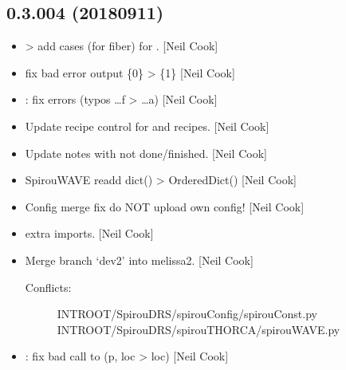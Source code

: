 \documentclass[a4paper,10pt,english]{report}
\begin{document}
\subsection{0.3.004 (2018\sphinxhyphen{}09\sphinxhyphen{}11)}
\label{\detokenize{misc/changelog:id350}}\begin{itemize}
\item {} 
 \textendash{}\textgreater{} add cases (for fiber) for .
{[}Neil Cook{]}

\item {} 
 \sphinxhyphen{} fix bad error output \{0\} \textendash{}\textgreater{} \{1\} {[}Neil Cook{]}

\item {} 
: fix errors (typos …f \textendash{}\textgreater{} …a) {[}Neil Cook{]}

\item {} 
Update recipe control for  and  recipes. {[}Neil Cook{]}

\item {} 
Update notes with not done/finished. {[}Neil Cook{]}

\item {} 
SpirouWAVE \sphinxhyphen{} re\sphinxhyphen{}add dict() \textendash{}\textgreater{} OrderedDict() {[}Neil Cook{]}

\item {} 
Config \sphinxhyphen{} merge fix \sphinxhyphen{} do NOT upload own config! {[}Neil Cook{]}

\item {} 
 \sphinxhyphen{} extra imports. {[}Neil Cook{]}

\item {} 
Merge branch ‘dev2’ into melissa2. {[}Neil Cook{]}
\begin{description}
\item[{Conflicts:}] \leavevmode
{}
INTROOT/SpirouDRS/spirouConfig/spirouConst.py
INTROOT/SpirouDRS/spirouTHORCA/spirouWAVE.py

\end{description}

\item {} 
: fix bad call to  (p, loc \textendash{}\textgreater{} loc)
{[}Neil Cook{]}


\end{itemize}
\end{document}

